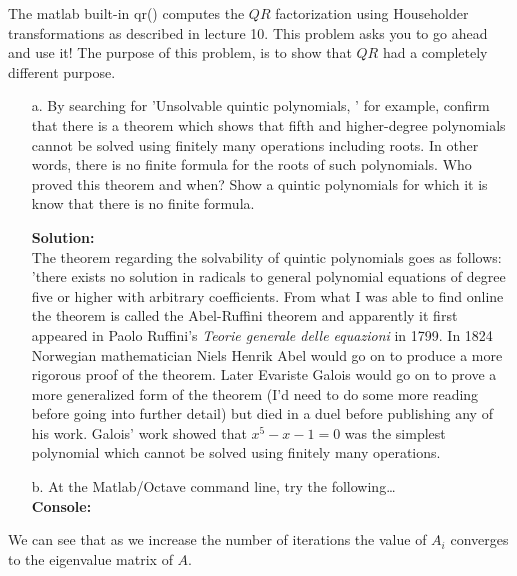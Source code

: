 \documentclass[12pt]{article}
\makeatletter
\theoremstyle{homework}
\newenvironment{exercise}[1]
{\def\@currentlabel{#1}\exercisecore}
{\endexercisecore}
\newcommand{\localhead}[1]{\par\smallskip\noindent\textbf{#1}\nobreak\\}%
\newcommand\solution{\localhead{Solution:}}
\makeatother
\begin{document}
\begin{exercise}{P15} The matlab built-in qr() computes the $QR$ factorization using Householder transformations as 
  described in lecture 10. This problem asks you to go ahead and use it! The purpose of this problem, is to 
  show that $QR$ had a completely different purpose.\\
  \begin{enumerate}
    \item[a.] By searching for 'Unsolvable quintic polynomials, ' for example, confirm that there is a theorem which shows that 
    fifth and higher-degree polynomials cannot be solved using finitely many operations including roots. In other words, there is 
    no finite formula for the roots of such polynomials. Who proved this theorem and when? Show a quintic polynomials for which it is know that 
    there is no finite formula. 
    \solution The theorem regarding the solvability of quintic polynomials goes as follows: 'there exists no solution in radicals to general 
    polynomial equations of degree five or higher with arbitrary coefficients. From what I was 
    able to find online the theorem is called the Abel-Ruffini theorem and apparently it first appeared in Paolo Ruffini's \emph{Teorie generale delle equazioni} 
    in 1799. In 1824 Norwegian mathematician Niels Henrik Abel would go on to produce a more rigorous proof of the theorem. Later Evariste Galois would go on to prove 
    a more generalized form of the theorem (I'd need to do some more reading before going into further detail) but died in a duel before publishing any of his work. Galois' work
    showed that $x^5 - x - 1 = 0$ was the simplest polynomial which cannot be solved using finitely many operations.\\
    \vspace{.15in}
    
    
    \item[b.] At the Matlab/Octave command line, try the following\dots\\
    \textbf{Console:}
    \begin{center}
      
    \end{center} 
  \end{enumerate}
  We can see that as we increase the number of iterations the value of $A_i$ converges to the eigenvalue matrix of 
  $A$.
  \vspace{.15in}


\end{exercise}
\end{document}
